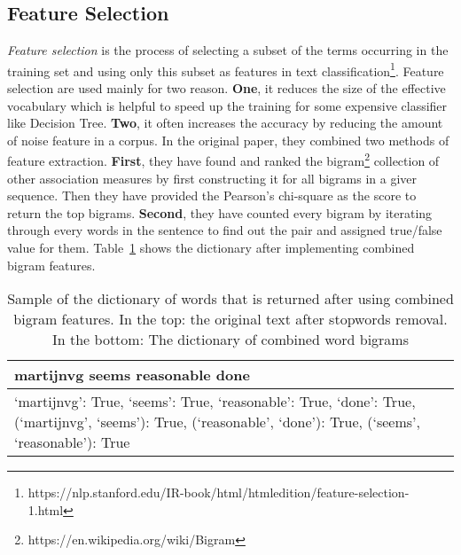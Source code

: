 \subsection{Feature Selection}  
\emph{Feature selection} is the process of selecting a subset of the terms occurring in the training set and using only this subset as features in text classification\footnote{https://nlp.stanford.edu/IR-book/html/htmledition/feature-selection-1.html}. Feature selection are used mainly for two reason. \noindent\textbf{One}, it reduces the size of the effective vocabulary which is helpful to speed up the training for some expensive classifier like Decision Tree. \noindent\textbf{Two}, it often increases the accuracy by reducing the amount of noise feature in a corpus. In the original paper, they combined two methods of feature extraction. \noindent\textbf{First}, they have found and ranked the bigram\footnote{https://en.wikipedia.org/wiki/Bigram} collection of other association measures by first constructing it for all bigrams in a giver sequence. Then they have provided the Pearson's chi-square as the score to return the top bigrams. \noindent\textbf{Second}, they have counted every bigram by iterating through every words in the sentence to find out the pair and assigned true/false value for them. Table~\ref{tbl:feature_selection} shows the dictionary after implementing combined bigram features.
  \begin{table}
	\caption{Sample of the dictionary of words that is returned after using combined bigram features. In the top: the original text after stopwords removal. In the bottom: The dictionary of combined word bigrams}
	\begin{tabular}{ p{3.25in}}
		\toprule
		martijnvg seems reasonable done \\
		\midrule
		{`martijnvg': True, `seems': True, `reasonable': True, `done': True, (`martijnvg', `seems'): True, (`reasonable', `done'): True, (`seems', `reasonable'): True} \\
		\bottomrule
		
	\end{tabular}
	\label{tbl:feature_selection}
\end{table} 